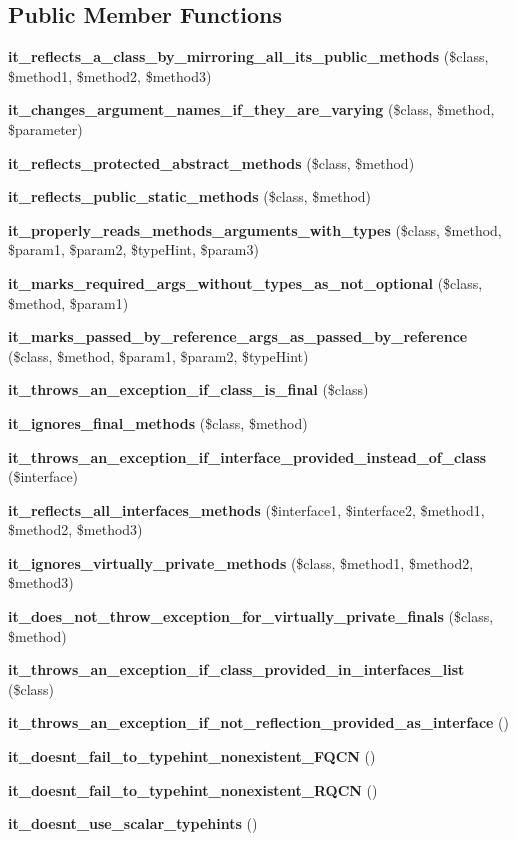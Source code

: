 \subsection*{Public Member Functions}
\begin{DoxyCompactItemize}
\item 
{\bf it\+\_\+reflects\+\_\+a\+\_\+class\+\_\+by\+\_\+mirroring\+\_\+all\+\_\+its\+\_\+public\+\_\+methods} (\$class, \$method1, \$method2, \$method3)
\item 
{\bf it\+\_\+changes\+\_\+argument\+\_\+names\+\_\+if\+\_\+they\+\_\+are\+\_\+varying} (\$class, \$method, \$parameter)
\item 
{\bf it\+\_\+reflects\+\_\+protected\+\_\+abstract\+\_\+methods} (\$class, \$method)
\item 
{\bf it\+\_\+reflects\+\_\+public\+\_\+static\+\_\+methods} (\$class, \$method)
\item 
{\bf it\+\_\+properly\+\_\+reads\+\_\+methods\+\_\+arguments\+\_\+with\+\_\+types} (\$class, \$method, \$param1, \$param2, \$type\+Hint, \$param3)
\item 
{\bf it\+\_\+marks\+\_\+required\+\_\+args\+\_\+without\+\_\+types\+\_\+as\+\_\+not\+\_\+optional} (\$class, \$method, \$param1)
\item 
{\bf it\+\_\+marks\+\_\+passed\+\_\+by\+\_\+reference\+\_\+args\+\_\+as\+\_\+passed\+\_\+by\+\_\+reference} (\$class, \$method, \$param1, \$param2, \$type\+Hint)
\item 
{\bf it\+\_\+throws\+\_\+an\+\_\+exception\+\_\+if\+\_\+class\+\_\+is\+\_\+final} (\$class)
\item 
{\bf it\+\_\+ignores\+\_\+final\+\_\+methods} (\$class, \$method)
\item 
{\bf it\+\_\+throws\+\_\+an\+\_\+exception\+\_\+if\+\_\+interface\+\_\+provided\+\_\+instead\+\_\+of\+\_\+class} (\$interface)
\item 
{\bf it\+\_\+reflects\+\_\+all\+\_\+interfaces\+\_\+methods} (\$interface1, \$interface2, \$method1, \$method2, \$method3)
\item 
{\bf it\+\_\+ignores\+\_\+virtually\+\_\+private\+\_\+methods} (\$class, \$method1, \$method2, \$method3)
\item 
{\bf it\+\_\+does\+\_\+not\+\_\+throw\+\_\+exception\+\_\+for\+\_\+virtually\+\_\+private\+\_\+finals} (\$class, \$method)
\item 
{\bf it\+\_\+throws\+\_\+an\+\_\+exception\+\_\+if\+\_\+class\+\_\+provided\+\_\+in\+\_\+interfaces\+\_\+list} (\$class)
\item 
{\bf it\+\_\+throws\+\_\+an\+\_\+exception\+\_\+if\+\_\+not\+\_\+reflection\+\_\+provided\+\_\+as\+\_\+interface} ()
\item 
{\bf it\+\_\+doesnt\+\_\+fail\+\_\+to\+\_\+typehint\+\_\+nonexistent\+\_\+\+F\+Q\+C\+N} ()
\item 
{\bf it\+\_\+doesnt\+\_\+fail\+\_\+to\+\_\+typehint\+\_\+nonexistent\+\_\+\+R\+Q\+C\+N} ()
\item 
{\bf it\+\_\+doesnt\+\_\+use\+\_\+scalar\+\_\+typehints} ()
\end{DoxyCompactItemize}
